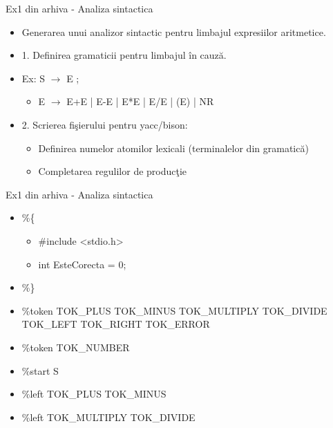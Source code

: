\documentclass[pdf]{beamer}
\begin{document}
\begin{frame}{Ex1 din arhiva - Analiza sintactica}
\begin{itemize}
	\item
	Generarea unui analizor sintactic pentru limbajul expresiilor aritmetice.

	\item
	1. Definirea gramaticii pentru limbajul în cauză.

	\item[]
	Ex: S  $\rightarrow$  E ;

		\begin{itemize}
			\item[]
			       E  $\rightarrow$  E+E | E-E | E*E | E/E | (E) | NR
		\end{itemize}

	\item
	2. Scrierea fişierului pentru yacc/bison:

		\begin{itemize}
			\item<cir@1->
			      Definirea numelor atomilor lexicali (terminalelor din gramatică)
			\item<cir@1->
				Completarea regulilor de producţie
		\end{itemize}

\end{itemize}
\end{frame}



\begin{frame}{Ex1 din arhiva - Analiza sintactica}
\begin{itemize}
	\item[]
	\%\{

		\begin{itemize}
			\item[]
			      \#include <stdio.h>
			\item[]
				int EsteCorecta = 0;
		\end{itemize}

	\item[]
	\%\}
		\linebreak

	\item[]
	\%token TOK\_PLUS TOK\_MINUS TOK\_MULTIPLY TOK\_DIVIDE TOK\_LEFT TOK\_RIGHT TOK\_ERROR

	\item[]
	\%token TOK\_NUMBER
		\linebreak

	\item[]
	\%start S
		\linebreak

	\item[]
	\%left TOK\_PLUS TOK\_MINUS

	\item[]
	\%left TOK\_MULTIPLY TOK\_DIVIDE

\end{itemize}
\end{frame}
\end{document}
